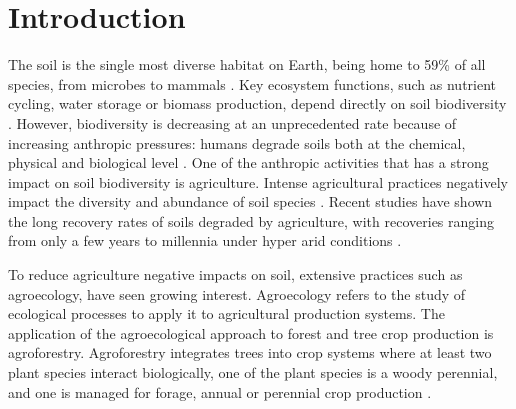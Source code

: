 \documentclass[fleqn,10pt]{ArtEcoFoG} %
\affiliation{
\textsuperscript{1}Tropical Forest Ecology Master, AgroParistech.\\ \hspace{1em} Campus Agronomique, 97310 Kourou, France.
}
\affiliation{*\textbf{}: , } %
\begin{document}

\flushbottom %

\maketitle %

\tableofcontents %

\thispagestyle{empty} %



\scriptsize

\normalsize

\section{Introduction}\label{introduction}

The soil is the single most diverse habitat on Earth, being home to 59\% of all species, from microbes to mammals \citep{anthony_enumerating_2023}. Key ecosystem functions, such as nutrient cycling, water storage or biomass production, depend directly on soil biodiversity \citep{brussaard_soil_2012, safaei_assessing_2019}. However, biodiversity is decreasing at an unprecedented rate because of increasing anthropic pressures: humans degrade soils both at the chemical, physical and biological level \citep{jose_agroforestry_2012, ferreira_soil_2022}. One of the anthropic activities that has a strong impact on soil biodiversity is agriculture. Intense agricultural practices negatively impact the diversity and abundance of soil species \citep{bedolla-rivera_analyzing_2023}. Recent studies have shown the long recovery rates of soils degraded by agriculture, with recoveries ranging from only a few years \citep{DOJANI2011263} to millennia under hyper arid conditions \citep{Weber2016}.

To reduce agriculture negative impacts on soil, extensive practices such as agroecology, have seen growing interest. Agroecology refers to the study of ecological processes to apply it to agricultural production systems. The application of the agroecological approach to forest and tree crop production is agroforestry. Agroforestry integrates trees into crop systems where at least two plant species interact biologically, one of the plant species is a woody perennial, and one is managed for forage, annual or perennial crop production \citep{somarriba_revisiting_1992}.
\end{document}

